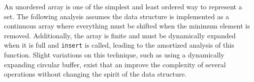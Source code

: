 An unordered array is one of the simplest and least ordered way to represent a set.  The following analysis assumes the data structure is implemented as a continuous array where everything must be shifted when the minimum element is removed.  Additionally, the array is finite and must be dynamically expanded when it is full and \texttt{insert} is called, leading to the amortized analysis of this function.  Slight variations on this technique, such as using a dynamically expanding circular buffer, exist that an improve the complexity of several operations without changing the spirit of the data structure.


